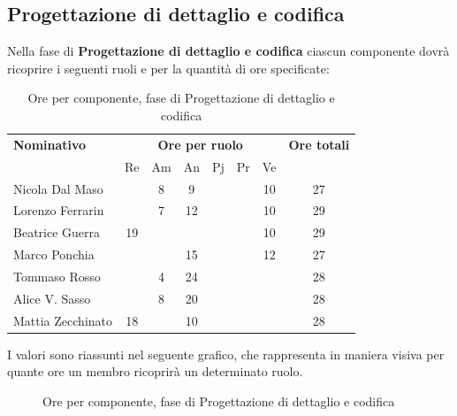 \subsection{Progettazione di dettaglio e codifica}
Nella fase di \textbf{Progettazione di dettaglio e codifica} ciascun componente dovrà ricoprire i seguenti ruoli e per la quantità di ore specificate:

\begin{table}[H]
	\centering
	\begin{tabular}{|l|c|c|c|c|c|c|c|}
		\hline
		\textbf{Nominativo} & 
		\multicolumn{6}{c|}{\textbf{Ore per ruolo}} & 
		\textbf{Ore totali} \\
		& Re & Am & An & Pj & Pr & Ve & \\
		\hline
		Nicola Dal Maso & & 8 & 9 & & & 10 & 27 \\
		Lorenzo Ferrarin & & 7 & 12 & & & 10 & 29 \\
		Beatrice Guerra & 19 & & & & & 10 & 29 \\
		Marco Ponchia & & & 15 & & & 12 & 27 \\
		Tommaso Rosso & & 4 & 24 & & & & 28 \\
		Alice V. Sasso & & 8 & 20 & & & & 28 \\
		Mattia Zecchinato & 18 & & 10 & & & & 28 \\
		\hline
	\end{tabular}
	\caption{Ore per componente, fase di Progettazione di dettaglio e codifica}
\end{table}
I valori sono riassunti nel seguente grafico, che rappresenta in maniera visiva per quante ore un membro ricoprirà un determinato ruolo.
\begin{figure}[H]
	\centering
	\caption{Ore per componente, fase di Progettazione di dettaglio e codifica}
\end{figure}

